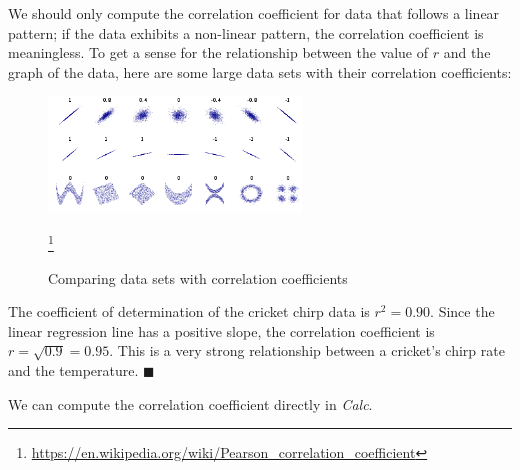 We should only compute the correlation coefficient for data that follows a linear pattern; if the data exhibits a non-linear pattern, the correlation coefficient is meaningless. To get a sense for the relationship between the value of $r$ and the graph of the data, here are some large data sets with their correlation coefficients:
\begin{figure}[!ht]
  \centering
  \includegraphics[width = 0.6\textwidth]{img/chap1/sec1-4/correlation_examples.png}
  \caption{Comparing data sets with correlation coefficients}
  \footnote{\url{https://en.wikipedia.org/wiki/Pearson_correlation_coefficient}}
  \end{figure}




\begin{example}
  The coefficient of determination of the cricket chirp data is $r^2 = 0.90$. Since the linear regression line has a positive slope, the correlation coefficient is $r = \sqrt{0.9} = 0.95$. This is a very strong relationship between a cricket's chirp rate and the temperature. \hfill $\blacksquare$
\end{example}

We can compute the correlation coefficient directly in {\em Calc}.

